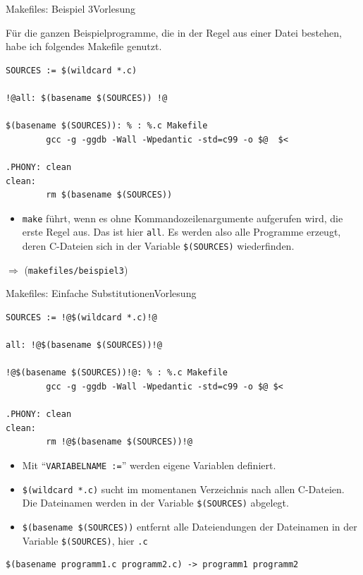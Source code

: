 \documentclass[xcolor=dvipsnames]{beamer}
\newcounter{lecturecounter}
\begin{document}
\begin{frame}[fragile]{Makefiles: Beispiel 3}{Vorlesung }
\begin{block}{}
  Für die ganzen Beispielprogramme, die in der Regel aus einer Datei bestehen, habe ich folgendes Makefile genutzt.
\end{block}
\begin{lstlisting}[basicstyle=\ttfamily\scriptsize]
SOURCES := $(wildcard *.c)                                                                                                                                  

!@all: $(basename $(SOURCES)) !@

$(basename $(SOURCES)): % : %.c Makefile
        gcc -g -ggdb -Wall -Wpedantic -std=c99 -o $@  $<

.PHONY: clean
clean:
        rm $(basename $(SOURCES))
\end{lstlisting}
\begin{itemize}
  \item{\verb|make| führt, wenn es ohne Kommandozeilenargumente aufgerufen wird, die erste Regel aus. Das ist hier \verb|all|. Es werden also alle Programme erzeugt, deren C-Dateien sich in der Variable \verb|$(SOURCES)| wiederfinden.}
\end{itemize}
$\Rightarrow$ (\verb|makefiles/beispiel3|)
\end{frame}

\begin{frame}[fragile]{Makefiles: Einfache Substitutionen}{Vorlesung }
\begin{lstlisting}[basicstyle=\ttfamily\scriptsize]
SOURCES := !@$(wildcard *.c)!@                                                                                                                                   

all: !@$(basename $(SOURCES))!@

!@$(basename $(SOURCES))!@: % : %.c Makefile
        gcc -g -ggdb -Wall -Wpedantic -std=c99 -o $@ $<

.PHONY: clean
clean:
        rm !@$(basename $(SOURCES))!@
\end{lstlisting}
\begin{block}{}
\begin{itemize}
  \item{Mit ``\verb|VARIABELNAME :=|'' werden eigene Variablen definiert.}
  \item{\verb|$(wildcard *.c)| sucht im momentanen Verzeichnis nach allen C-Dateien. Die Dateinamen werden in der Variable \verb|$(SOURCES)| abgelegt.}
  \item{\verb|$(basename $(SOURCES))| entfernt alle Dateiendungen der Dateinamen in der Variable \verb|$(SOURCES)|, hier \verb|.c|}
\end{itemize}
\end{block}
\begin{verbatim}
$(basename programm1.c programm2.c) -> programm1 programm2
\end{verbatim}
\end{frame}
\end{document}
